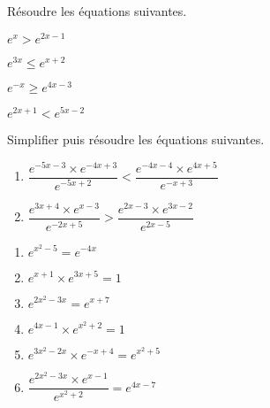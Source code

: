\documentclass[11pt]{article}
\begin{document}
\begin{multicols}{2}
\begin{exercice}[2]
Résoudre les équations suivantes.
\begin{enumerate}
\begin{multicols}{2}
\item \( e^{x} > e^{2x-1} \)
\item \( e^{3x} \leq e^{x+2} \)
\item \( e^{-x} \geq e^{4x-3} \)
\item \( e^{2x+1} < e^{5x-2} \)
\end{multicols}
\end{enumerate}
\end{exercice}

\begin{exercice}[3]
Simplifier puis résoudre les équations suivantes.
\begin{enumerate}
\item $\dfrac{e^{-5x-3} \times e^{-4x+3}}{e^{-5x+2}} < \dfrac{e^{-4x-4} \times e^{4x+5}}{e^{-x+3}}$
\item $\dfrac{e^{3x+4} \times e^{x-3}}{e^{-2x+5}} > \dfrac{e^{2x-3} \times e^{3x-2}}{e^{2x-5}}$
\end{enumerate}
\end{exercice}
\end{multicols}


\begin{exercice}
\begin{multicols}{2}
\begin{enumerate}
\item $e^{x^2-5}=e^{-4x}$
\item $e^{x+1}\times e^{3x+5} =1$
\item \( e^{2x^2 - 3x} = e^{x + 7} \)
\item \( e^{4x - 1} \times e^{x^2 + 2} = 1 \)
\item \( e^{3x^2 - 2x} \times e^{-x + 4} = e^{x^2 + 5} \)
\item \( \dfrac{e^{2x^2 - 3x} \times e^{x - 1}}{e^{x^2 + 2}} = e^{4x - 7} \)
\end{enumerate}
\end{multicols}
\end{exercice}
\end{document}
